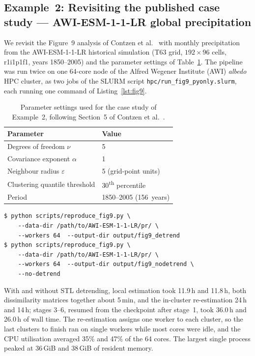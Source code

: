 \documentclass[preprint,12pt,a4paper]{elsarticle}
\begin{document}
\FloatBarrier

\subsection{Example~2: Revisiting the published case study --- AWI-ESM-1-1-LR
  global precipitation}
\label{sec:ex-fig9}

We revisit the Figure~9 analysis of Contzen et al.~\cite{contzen2025} with
monthly precipitation from the AWI-ESM-1-1-LR
historical simulation (T63 grid, $192 \times 96$ cells, r1i1p1f1,
years 1850--2005) and the parameter settings of
Table~\ref{tab:fig9-params}. The pipeline was run twice on one
64-core node of the Alfred Wegener Institute (AWI)
\emph{albedo} HPC cluster, as two jobs of the SLURM script
\texttt{hpc/run\_fig9\_pyonly.slurm}, each running one command of
Listing~\ref{lst:fig9}.

\begin{table}[ht]
\centering
\begin{tabular}{ll}
\toprule
\textbf{Parameter} & \textbf{Value} \\
\midrule
Degrees of freedom $\nu$ & 5 \\
Covariance exponent $\alpha$ & 1 \\
Neighbour radius $\varepsilon$ & 5 (grid-point units) \\
Clustering quantile threshold & 30\textsuperscript{th} percentile \\
Period & 1850--2005 (156~years) \\
\bottomrule
\end{tabular}
\caption{Parameter settings used for the case study of Example~2,
  following Section~5 of Contzen et al.~\cite{contzen2025}.}
\label{tab:fig9-params}
\end{table}

\begin{lstlisting}[caption={Running the case study of Example~2 on HPC.},
  label=lst:fig9, numbers=none]
$ python scripts/reproduce_fig9.py \
    --data-dir /path/to/AWI-ESM-1-1-LR/pr/ \
    --workers 64  --output-dir output/fig9_detrend
$ python scripts/reproduce_fig9.py \
    --data-dir /path/to/AWI-ESM-1-1-LR/pr/ \
    --workers 64  --output-dir output/fig9_nodetrend \
    --no-detrend
\end{lstlisting}

With and without STL detrending, local estimation took 11.9\,h and
11.8\,h, both dissimilarity matrices together about 5\,min, and the
in-cluster re-estimation 24\,h and 14\,h; stages 3--6, resumed from
the checkpoint after stage~1, took 36.0\,h and 26.0\,h of wall time.
The re-estimation assigns one worker to each cluster, so the last
clusters to finish ran on single workers while most cores were idle,
and the CPU utilisation averaged 35\% and 47\% of the 64 cores. The
largest single process peaked at 36\,GiB and 38\,GiB of resident
memory.
\end{document}
